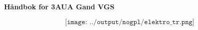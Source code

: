 \documentclass[10pt,a5paper,norsk]{article}
\begin{document}
\huge
\begin{center}
\textbf{Håndbok for 3AUA Gand VGS} \bigskip
\end{center}

\vskip 1cm
		$$\texttt{[image: ../output/nogpl/elektro\_tr.png]}$$
\normalsize
\vfil \eject












\vfil \eject
\end{document}
